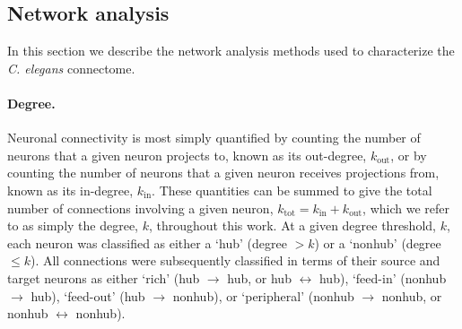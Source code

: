 \subsection*{Network analysis}
In this section we describe the network analysis methods used to characterize the \emph{C. elegans} connectome.

\paragraph{Degree.}
Neuronal connectivity is most simply quantified by counting the number of neurons that a given neuron projects to, known as its out-degree, $k_\mathrm{out}$, or by counting the number of neurons that a given neuron receives projections from, known as its in-degree, $k_\mathrm{in}$.
These quantities can be summed to give the total number of connections involving a given neuron, $k_\mathrm{tot} = k_\mathrm{in} + k_\mathrm{out}$, which we refer to as simply the degree, $k$, throughout this work.
At a given degree threshold, $k$, each neuron was classified as either a `hub' (degree $>k$) or a `nonhub' (degree $\leq k$).
All connections were subsequently classified in terms of their source and target neurons as either
`rich' (hub $\rightarrow$ hub, or hub $\leftrightarrow$ hub),
`feed-in' (nonhub $\rightarrow$ hub),
`feed-out' (hub $\rightarrow$ nonhub),
or `peripheral' (nonhub $\rightarrow$ nonhub, or nonhub $\leftrightarrow$ nonhub).

